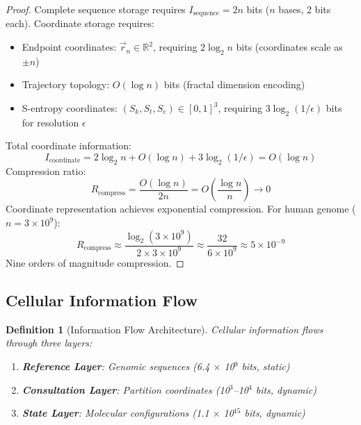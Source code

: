 \documentclass[11pt,a4paper]{article}
\newtheorem{definition}[theorem]{Definition}
\theoremstyle{remark}
\newcommand{\Sk}{S_k}
\newcommand{\St}{S_t}
\newcommand{\Se}{S_e}
\begin{document}
\begin{proof}
Complete sequence storage requires $I_{\text{sequence}} = 2n$ bits ($n$ bases, 2 bits each). Coordinate storage requires:
\begin{itemize}
\item Endpoint coordinates: $\vec{r}_n \in \mathbb{R}^2$, requiring $2\log_2 n$ bits (coordinates scale as $\pm n$)
\item Trajectory topology: $O(\log n)$ bits (fractal dimension encoding)
\item S-entropy coordinates: $(\Sk, \St, \Se) \in [0,1]^3$, requiring $3\log_2(1/\epsilon)$ bits for resolution $\epsilon$
\end{itemize}
Total coordinate information:
\begin{equation}
I_{\text{coordinate}} = 2\log_2 n + O(\log n) + 3\log_2(1/\epsilon) = O(\log n)
\end{equation}
Compression ratio:
\begin{equation}
R_{\text{compress}} = \frac{O(\log n)}{2n} = O\left(\frac{\log n}{n}\right) \to 0
\end{equation}
Coordinate representation achieves exponential compression. For human genome ($n = 3 \times 10^9$):
\begin{equation}
R_{\text{compress}} \approx \frac{\log_2(3 \times 10^9)}{2 \times 3 \times 10^9} \approx \frac{32}{6 \times 10^9} \approx 5 \times 10^{-9}
\end{equation}
Nine orders of magnitude compression.
\end{proof}

\subsection{Cellular Information Flow}

\begin{definition}[Information Flow Architecture]
\label{def:info_flow}
Cellular information flows through three layers:
\begin{enumerate}
\item \textbf{Reference Layer}: Genomic sequences (6.4 $\times$ 10$^9$ bits, static)
\item \textbf{Consultation Layer}: Partition coordinates (10$^3$--10$^4$ bits, dynamic)
\item \textbf{State Layer}: Molecular configurations (1.1 $\times$ 10$^{15}$ bits, dynamic)
\end{enumerate}
\end{definition}
\end{document}
